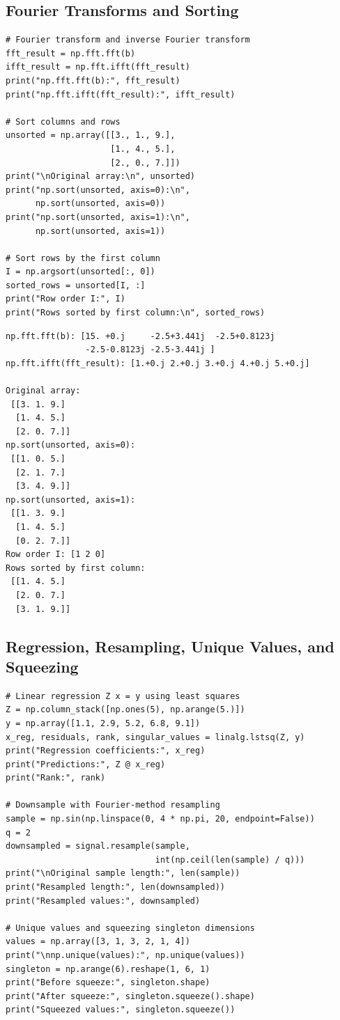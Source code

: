 \documentclass[11pt]{article}
\begin{document}
\subsection{Fourier Transforms and Sorting}

\begin{lstlisting}[style=python]
# Fourier transform and inverse Fourier transform
fft_result = np.fft.fft(b)
ifft_result = np.fft.ifft(fft_result)
print("np.fft.fft(b):", fft_result)
print("np.fft.ifft(fft_result):", ifft_result)

# Sort columns and rows
unsorted = np.array([[3., 1., 9.],
                     [1., 4., 5.],
                     [2., 0., 7.]])
print("\nOriginal array:\n", unsorted)
print("np.sort(unsorted, axis=0):\n",
      np.sort(unsorted, axis=0))
print("np.sort(unsorted, axis=1):\n",
      np.sort(unsorted, axis=1))

# Sort rows by the first column
I = np.argsort(unsorted[:, 0])
sorted_rows = unsorted[I, :]
print("Row order I:", I)
print("Rows sorted by first column:\n", sorted_rows)
\end{lstlisting}

\begin{lstlisting}[style=terminal]
np.fft.fft(b): [15. +0.j     -2.5+3.441j  -2.5+0.8123j
                -2.5-0.8123j -2.5-3.441j ]
np.fft.ifft(fft_result): [1.+0.j 2.+0.j 3.+0.j 4.+0.j 5.+0.j]

Original array:
 [[3. 1. 9.]
  [1. 4. 5.]
  [2. 0. 7.]]
np.sort(unsorted, axis=0):
 [[1. 0. 5.]
  [2. 1. 7.]
  [3. 4. 9.]]
np.sort(unsorted, axis=1):
 [[1. 3. 9.]
  [1. 4. 5.]
  [0. 2. 7.]]
Row order I: [1 2 0]
Rows sorted by first column:
 [[1. 4. 5.]
  [2. 0. 7.]
  [3. 1. 9.]]
\end{lstlisting}

\subsection{Regression, Resampling, Unique Values, and Squeezing}

\begin{lstlisting}[style=python]
# Linear regression Z x = y using least squares
Z = np.column_stack([np.ones(5), np.arange(5.)])
y = np.array([1.1, 2.9, 5.2, 6.8, 9.1])
x_reg, residuals, rank, singular_values = linalg.lstsq(Z, y)
print("Regression coefficients:", x_reg)
print("Predictions:", Z @ x_reg)
print("Rank:", rank)

# Downsample with Fourier-method resampling
sample = np.sin(np.linspace(0, 4 * np.pi, 20, endpoint=False))
q = 2
downsampled = signal.resample(sample,
                              int(np.ceil(len(sample) / q)))
print("\nOriginal sample length:", len(sample))
print("Resampled length:", len(downsampled))
print("Resampled values:", downsampled)

# Unique values and squeezing singleton dimensions
values = np.array([3, 1, 3, 2, 1, 4])
print("\nnp.unique(values):", np.unique(values))
singleton = np.arange(6).reshape(1, 6, 1)
print("Before squeeze:", singleton.shape)
print("After squeeze:", singleton.squeeze().shape)
print("Squeezed values:", singleton.squeeze())
\end{lstlisting}
\end{document}
